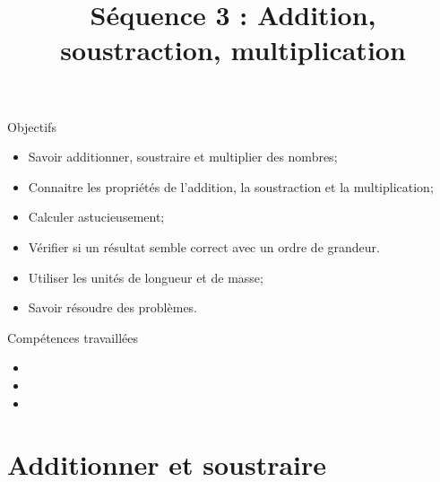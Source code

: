 \documentclass[xcolor={dvipsnames}]{beamer}
\title[3 : Addition, soustraction, multiplication]{Séquence 3 : Addition, soustraction, multiplication}
\begin{document}
\begin{frame}
  \titlepage 
\end{frame}


	

\begin{frame}
	\begin{block}{Objectifs}
		\begin{itemize}
			\item Savoir additionner, soustraire et multiplier des nombres;
			\item Connaitre les propriétés de l’addition, la soustraction et la multiplication;
			\item Calculer astucieusement;
			\item Vérifier si un résultat semble correct avec un ordre de grandeur.
			\item Utiliser les unités de longueur et de masse;
			\item Savoir résoudre des problèmes.
		\end{itemize}
	\end{block}
\end{frame}

\begin{frame}
	\begin{block}{Compétences travaillées}
		
		\begin{itemize}
			
			\item {}
			\item {}
			\item {}
			
		\end{itemize}
	\end{block}
\end{frame}



\section{Additionner et soustraire}
\end{document}
